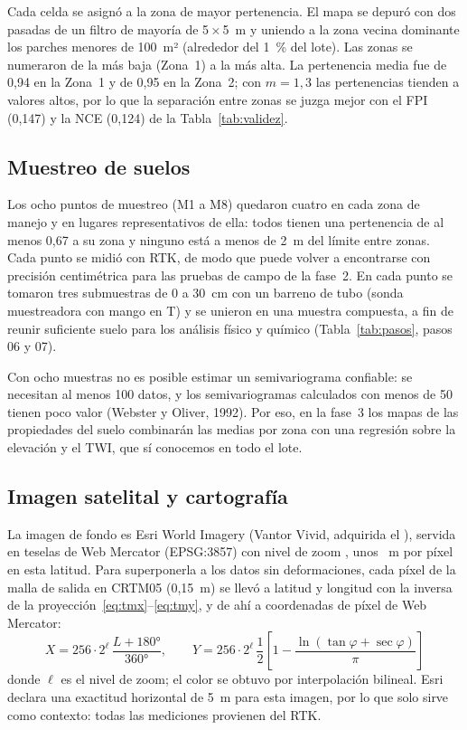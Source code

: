 \documentclass[10pt]{article}
\begin{document}
Cada celda se asignó a la zona de mayor pertenencia. El mapa se depuró con dos pasadas de un filtro de mayoría de
5\,×\,5~m y uniendo a la zona vecina dominante los parches menores de 100~m² (alrededor del 1~\% del lote). Las zonas se
numeraron de la más baja (Zona~1) a la más alta. La pertenencia media fue de 0,94 en la Zona~1 y de 0,95 en la
Zona~2; con \(m = 1{,}3\) las pertenencias tienden a valores altos, por lo que la separación entre zonas se juzga mejor
con el FPI (0,147) y la NCE (0,124) de la Tabla~\ref{tab:validez}.

\subsection{Muestreo de suelos}\label{sec:met-suelo}
Los ocho puntos de muestreo (M1 a M8) quedaron cuatro en cada zona de manejo y en lugares representativos de ella:
todos tienen una pertenencia de al menos 0,67 a su zona y ninguno está a menos de 2~m del límite entre zonas. Cada punto se
midió con RTK, de modo que puede volver a encontrarse con precisión centimétrica para las pruebas de campo de la
fase~2. En cada punto se tomaron tres submuestras de 0 a 30~cm con un barreno de tubo (sonda muestreadora con mango en T) y se unieron en una muestra compuesta, a fin de
reunir suficiente suelo para los análisis físico y químico (Tabla~\ref{tab:pasos}, pasos 06 y 07).

Con ocho muestras no es posible estimar un semivariograma confiable: se necesitan al menos 100 datos, y los
semivariogramas calculados con menos de 50 tienen poco valor (Webster y Oliver, 1992). Por eso, en la fase~3 los
mapas de las propiedades del suelo combinarán las medias por zona con una regresión sobre la elevación y el TWI, que
sí conocemos en todo el lote.

\subsection{Imagen satelital y cartografía}\label{sec:met-carto}
La imagen de fondo es Esri World Imagery (Vantor Vivid, adquirida el \FechaImagen), servida en teselas de Web Mercator
(EPSG:3857) con nivel de zoom \ZoomImagen, unos \PixelImagen~m por píxel en esta latitud. Para superponerla a los
datos sin deformaciones, cada píxel de la malla de salida en CRTM05 (0,15~m) se llevó a latitud y longitud con la
inversa de la proyección~\eqref{eq:tmx}–\eqref{eq:tmy}, y de ahí a coordenadas de píxel de Web Mercator:
\begin{equation}
  X = 256\cdot 2^{\ell}\,\frac{L + 180\text{°}}{360\text{°}}, \qquad
  Y = 256\cdot 2^{\ell}\,\frac{1}{2}\left[1 - \frac{\ln\left(\tan\varphi + \sec\varphi\right)}{\pi}\right]
  \label{eq:webmerc}
\end{equation}
donde \(\ell\) es el nivel de zoom; el color se obtuvo por interpolación bilineal. Esri declara una exactitud horizontal
de 5~m para esta imagen, por lo que solo sirve como contexto: todas las mediciones provienen del RTK.
\end{document}
